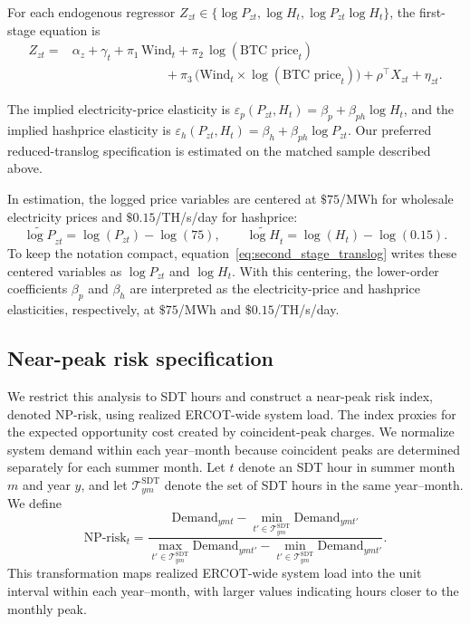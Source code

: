\documentclass[pdflatex,sn-mathphys-num]{sn-jnl}%
\theoremstyle{thmstyleone}%
\theoremstyle{thmstyletwo}%
\theoremstyle{thmstylethree}%
\begin{document}
For each endogenous regressor $Z_{zt}\in\{\log P_{zt},\log H_t,\log P_{zt}\log H_t\}$, the first-stage equation is
\begin{equation}
\label{eq:first_stage_generic}
\begin{aligned}
Z_{zt}
= {} & \alpha_z + \gamma_t
+ \pi_1\,\text{Wind}_t
+ \pi_2\,\log(\text{BTC price}_t) \\
& {} ~~~~~~~~~~~~~~~~~~~~~~~~~~~~~~~~~+ \pi_3\,\big(\text{Wind}_t \times \log(\text{BTC price}_t)\big) + \rho^\top X_{zt}
+ \eta_{zt}.
\end{aligned}
\end{equation}

The implied electricity-price elasticity is $\varepsilon_p(P_{zt},H_t)=\beta_p+\beta_{ph}\log H_t$, and the implied hashprice elasticity is $\varepsilon_h(P_{zt},H_t)=\beta_h+\beta_{ph}\log P_{zt}$. Our preferred reduced-translog specification is estimated on the matched sample described above.

In estimation, the logged price variables are centered at $\$75$/MWh for wholesale electricity prices and $\$0.15$/TH/s/day for hashprice:
\begin{equation}
\widetilde{\log P}_{zt} = \log(P_{zt}) - \log(75),
\qquad
\widetilde{\log H}_{t} = \log(H_t) - \log(0.15).
\end{equation}
To keep the notation compact, equation~\eqref{eq:second_stage_translog} writes these centered variables as $\log P_{zt}$ and $\log H_t$. With this centering, the lower-order coefficients $\beta_p$ and $\beta_h$ are interpreted as the electricity-price and hashprice elasticities, respectively, at $\$75$/MWh and $\$0.15$/TH/s/day.


\subsection*{Near-peak risk specification}

We restrict this analysis to SDT hours and construct a near-peak risk index, denoted NP-risk, using realized ERCOT-wide system load. The index proxies for the expected opportunity cost created by coincident-peak charges. We normalize system demand within each year--month because coincident peaks are determined separately for each summer month. Let $t$ denote an SDT hour in summer month $m$ and year $y$, and let $\mathcal{T}^{\text{SDT}}_{ym}$ denote the set of SDT hours in the same year--month. We define
\begin{equation}
\label{eq:np_index}
\text{NP-risk}_{t} = \frac{\text{Demand}_{ymt} - \min_{t' \in \mathcal{T}^{\text{SDT}}_{ym}} \text{Demand}_{ymt'}}
     {\max_{t' \in \mathcal{T}^{\text{SDT}}_{ym}} \text{Demand}_{ymt'} - \min_{t' \in \mathcal{T}^{\text{SDT}}_{ym}} \text{Demand}_{ymt'}}.
\end{equation}
This transformation maps realized ERCOT-wide system load into the unit interval within each year--month, with larger values indicating hours closer to the monthly peak.
\end{document}
